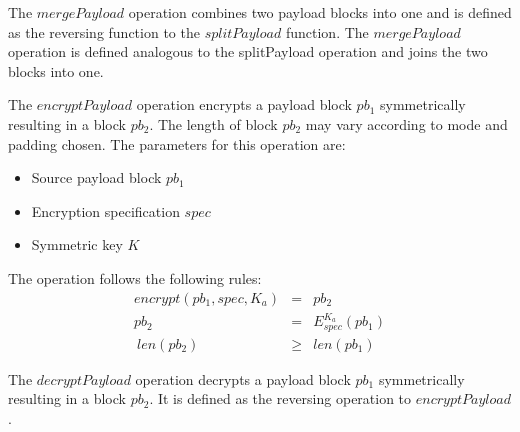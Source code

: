 \documentclass[acmsmall, screen, review]{acmart}
\begin{document}
	The $mergePayload$ operation combines two payload blocks into one and is defined as the reversing function to the $splitPayload$ function. 
	The $mergePayload$ operation is defined analogous to the splitPayload operation and joins the two blocks into one.
	
	The $encryptPayload$ operation encrypts a payload block $pb_1$ symmetrically resulting in a block $pb_2$. The length of block $pb_2$ may vary according to mode and padding chosen. The parameters for this operation are:
	\begin{itemize}
		\item Source payload block $pb_1$
		\item Encryption specification $spec$
		\item Symmetric key $K$
	\end{itemize}
	
	The operation follows the following rules:
	\begin{eqnarray}
	encrypt(pb_1, spec, K_a) & = & pb_2 \\
	pb_2 & = & E_{spec}^{K_a}\left( pb_1 \right)\\\
	len(pb_2) & \geq & len(pb_1)
	\end{eqnarray}
	
	
	The $decryptPayload$ operation decrypts a payload block $pb_1$ symmetrically resulting in a block $pb_2$. It is defined as the reversing operation to $encryptPayload$. 
	
	
\end{document}
